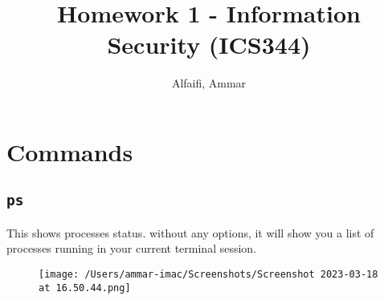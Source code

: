 \documentclass{article}
\title{Homework 1 - Information Security (ICS344)}
\author{Alfaifi, Ammar}
\date{}
\def\c#1{\texttt{#1}}
\begin{document}
\maketitle

\section{Commands}
\subsection{\c{ps}}

This shows processes status. without any options, it will show you a list of processes
running in your current terminal session.

\begin{figure}[ht]
	\centering
	\texttt{[image: /Users/ammar-imac/Screenshots/Screenshot 2023-03-18 at 16.50.44.png]}
\end{figure}
\end{document}
